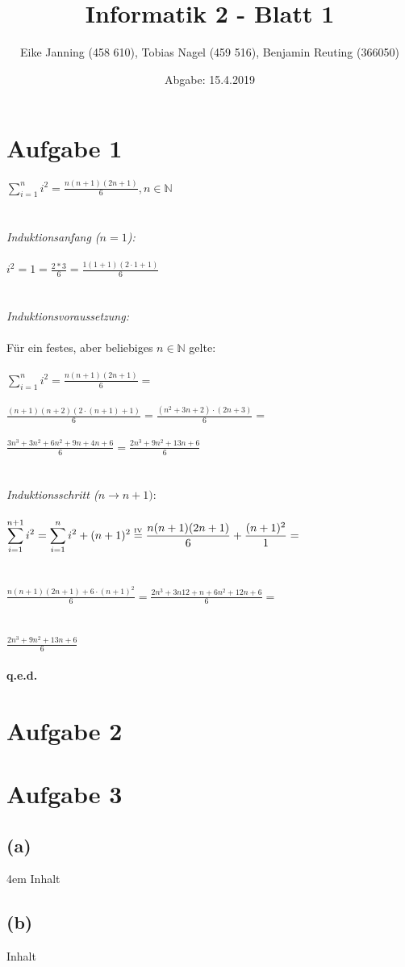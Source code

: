 \documentclass[11pt]{article}
\title{Informatik 2 - Blatt 1}
\author{Eike Janning (458 610), Tobias Nagel (459 516), Benjamin Reuting (366050)}
\date{Abgabe: 15.4.2019}
\begin{document}
\maketitle

\section*{Aufgabe 1}

$\displaystyle\sum_{i=1}^{n} i^2 = \frac{n(n+1)(2n+1)}{6}, n\in\mathbb{N}$
\\\\\\
\textit{Induktionsanfang ($n=1$):}\\\\
$i^2 = 1 = \frac{2*3}{6} = \frac{1(1+1)(2\cdot1+1)}{6}$
\\\\\\
\textit{Induktionsvoraussetzung:}\\\\
Für ein festes, aber beliebiges $n\in\mathbb{N}$ gelte:\\\\
$\displaystyle\sum_{i=1}^{n} i^2 = \frac{n(n+1)(2n+1)}{6} = $\\\\
$\displaystyle\frac{(n+1)(n+2)(2 \cdot (n+1)+1)}{6} = \frac{(n^2+3n+2) \cdot (2n+3)}{6} = $\\\\
$\displaystyle\frac{3n^3+3n^2+6n^2+9n+4n+6}{6} = \frac{2n^3+9n^2+13n+6}{6}$
\\\\\\
\textit{Induktionsschritt ($n \to n+1):$}\\\\
$\displaystyle\sum_{i=1}^{n+1} i^2 = \displaystyle\sum_{i=1}^{n} i^2 + (n+1)^2 \overset{\text{\tiny{IV}}}{=} \frac{n(n+1)(2n+1)}{6} + \frac{(n+1)^2}{1} = $\\\\\\
$\displaystyle\frac{n(n+1)(2n+1) + 6 \cdot (n+1)^2}{6} = \frac{2n^3+3n12+n+6n^2+12n+6}{6} = $\\\\\\
$\displaystyle\frac{2n^3+9n^2+13n+6}{6}$\\\\
\textbf{q.e.d.}

\section*{Aufgabe 2}

\section*{Aufgabe 3}

\subsection*{(a)}

\begingroup
\leftskip 4em
Inhalt
\endgroup

\subsection*{(b)}

Inhalt
\end{document}
